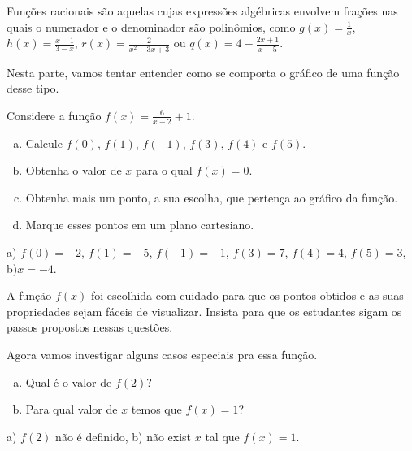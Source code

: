 \documentclass[main.tex]{subfiles}
\begin{document}
Funções racionais são aquelas cujas expressões algébricas envolvem frações nas quais o numerador e o denominador são polinômios, como $g(x)=\frac{1}{x}$, $h(x)=\frac{x-1}{3-x}$, $r(x)=\frac{2}{x^2-3x+3}$ ou $q(x)=4-\frac{2x+1}{x-5}$.

Nesta parte, vamos tentar entender como se comporta o gráfico de uma função desse tipo.

\begin{questao}
Considere a função $f(x)=\frac{6}{x-2}+1$.
\begin{enumerate}[a)]
\item Calcule $f(0)$, $f(1)$, $f(-1)$, $f(3)$, $f(4)$ e $f(5)$.
\item Obtenha o valor de $x$ para o qual $f(x)=0$.
\item Obtenha mais um ponto, a sua escolha, que pertença ao gráfico da função.
\item Marque esses pontos em um plano cartesiano.
\end{enumerate}
\end{questao}

\begin{gabarito}
	\begin{gabaritoQuestao}
		a) $f(0)=-2$, $f(1)=-5$, $f(-1)=-1$, $f(3)=7$, $f(4)=4$, $f(5)=3$, b)$x=-4$.
	\end{gabaritoQuestao}
\end{gabarito}

\paraTutores

A função $f(x)$ foi escolhida com cuidado para que os pontos obtidos e as suas propriedades sejam fáceis de visualizar. Insista para que os estudantes sigam os passos propostos nessas questões.

\paraAmbos

\begin{questao}
Agora vamos investigar alguns casos especiais pra essa função.
\begin{enumerate}[a)]
\item Qual é o valor de $f(2)$?
\item Para qual valor de $x$ temos que $f(x)=1$?
\end{enumerate}
\end{questao}

\begin{gabarito}
	\begin{gabaritoQuestao}
		a) $f(2)$ não é definido, b) não exist $x$ tal que $f(x)=1$.
	\end{gabaritoQuestao}
\end{gabarito}
\end{document}
